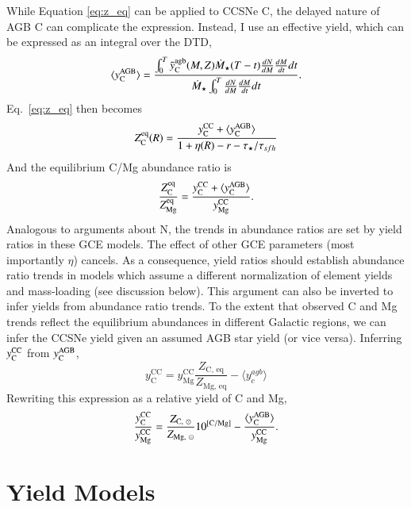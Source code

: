 \documentclass[12pt,oneside]{report}
\newcommand{\Ycc}{\ensuremath{y_{\rm C}^{\rm CC}}}
\newcommand{\Yoc}{\ensuremath{y_{\rm Mg}^{\rm CC}}}
\newcommand{\Ycagb}{\ensuremath{y_{\rm C}^{\rm AGB}}}
\begin{document}
While Equation \ref{eq:z_eq} can be applied to CCSNe C, the delayed nature of AGB C can complicate the expression. Instead, I use an effective yield, which can be expressed as an integral over the DTD,
\begin{equation}
    \langle \Ycagb\rangle = \frac{\int_0^T \tilde{y}_{\rm C}^{\rm agb}(M, Z) \dot{M}_\star(T - t) \frac{dN}{dM} \frac{dM}{dt} dt  }{ \dot{M}_\star \int_0^T \frac{dN}{dM} \frac{dM}{dt} dt}.
\end{equation}
Eq.~\ref{eq:z_eq} then becomes
\begin{equation}
    Z_{\rm C}^{\rm eq}(R) = \frac{\Ycc + \langle\Ycagb\rangle}{1 + \eta(R) - r - \tau_\star / \tau_{sfh}}
\end{equation}
And the equilibrium C/Mg abundance ratio is
\begin{equation}\label{eq:z_co}
    \frac{Z_{\rm C}^{\rm eq}}{Z_{\rm Mg}^{\rm eq}} = \frac{\Ycc + \langle \Ycagb \rangle }{\Yoc}.
\end{equation}
Analogous to \cite{james+23} arguments about N, the trends in abundance ratios are set by yield ratios in these GCE models. The effect of other GCE parameters (most importantly $\eta$) cancels. As a consequence, yield ratios should establish abundance ratio trends in models which assume a different normalization of element yields and mass-loading (see discussion below).
This argument can also be inverted to infer  yields from abundance ratio trends. To the extent that observed C and Mg trends reflect the equilibrium abundances in different Galactic regions, we can infer the CCSNe yield given an assumed AGB star yield (or vice versa). Inferring $\Ycc$ from $\Ycagb$, 
\begin{equation}
    y_\text{C}^\text{CC} =  y_\text{Mg}^\text{CC} \frac{Z_\text{C,~eq}}{Z_\text{Mg,~eq}} - \langle y_c^{agb} \rangle
\end{equation}
Rewriting this expression as a relative yield of C and Mg,
\begin{equation}\label{eq:y_c_eq}
    \frac{\Ycc}{\Yoc} = \frac{Z_{\text{C},~\odot}}{Z_{\text{Mg},~\odot}} 10^{\rm [C/Mg]} - \frac{\langle \Ycagb \rangle}{\Yoc}.
\end{equation}

\section{Yield Models}
\end{document}
